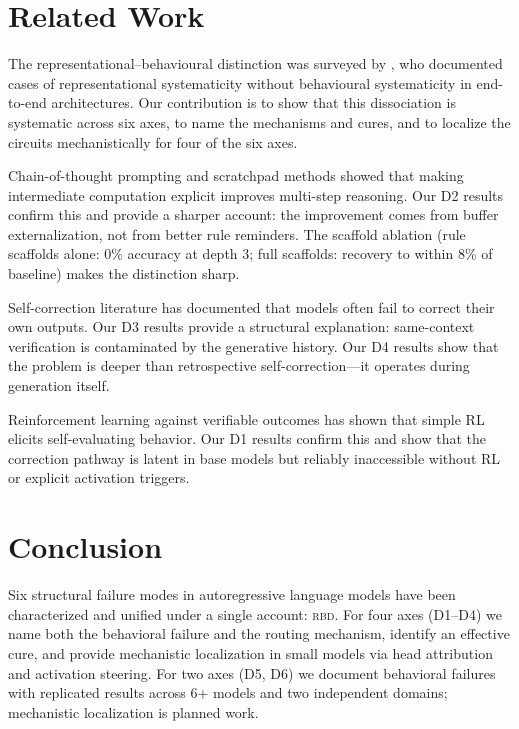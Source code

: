 \documentclass[11pt]{article}
\newcommand{\rbd}{\textsc{rbd}}
\begin{document}
\section{Related Work}
\label{sec:related}

The representational--behavioural distinction was surveyed by
\citet{vegner2025systematicity}, who documented cases of representational
systematicity without behavioural systematicity in end-to-end
architectures. Our contribution is to show that this dissociation is
systematic across six axes, to name the mechanisms and cures, and to
localize the circuits mechanistically for four of the six axes.

Chain-of-thought prompting \citep{wei2022chain} and scratchpad methods
\citep{nye2022show} showed that making intermediate computation explicit
improves multi-step reasoning. Our D2 results confirm this and provide a
sharper account: the improvement comes from buffer externalization, not
from better rule reminders. The scaffold ablation (rule scaffolds alone:
0\% accuracy at depth 3; full scaffolds: recovery to within 8\% of
baseline) makes the distinction sharp.

Self-correction literature \citep{madaan2023selfrefine,shinn2023reflexion,
huang2024large} has documented that models often fail to correct their
own outputs. Our D3 results provide a structural explanation: same-context
verification is contaminated by the generative history. Our D4 results
show that the problem is deeper than retrospective self-correction---it
operates during generation itself.

Reinforcement learning against verifiable outcomes
\citep{deepseek2025incentivizing,kimi2025scaling} has shown that simple
RL elicits self-evaluating behavior. Our D1 results confirm this and show
that the correction pathway is latent in base models but reliably
inaccessible without RL or explicit activation triggers.

\section{Conclusion}
\label{sec:conclusion}

Six structural failure modes in autoregressive language models have been
characterized and unified under a single account: \rbd{}. For four axes
(D1--D4) we name both the behavioral failure and the routing mechanism,
identify an effective cure, and provide mechanistic localization in small
models via head attribution and activation steering. For two axes (D5,
D6) we document behavioral failures with replicated results across 6+
models and two independent domains; mechanistic localization is planned
work.
\end{document}
